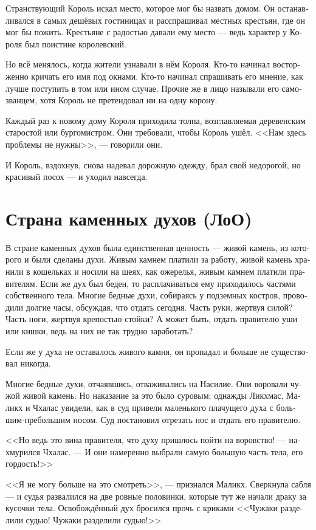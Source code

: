 \documentclass[a4paper,12pt,fleqn]{book}\usepackage{cooltooltips}\usepackage{polyglossia}\setdefaultlanguage[babelshorthands=true]{russian}\setotherlanguage{english}\defaultfontfeatures{Ligatures=TeX,Mapping=tex-text} \usepackage{xcolor}\definecolor{lightgray}{HTML}{bbbbbb}\color{lightgray}\newcommand{\ml}[3]{\textenglish{\textcolor{black}{#3}}}
\begin{document}
{Странствующий Король искал место, которое мог бы назвать домом.
Он останавливался в самых дешёвых гостиницах и расспрашивал местных крестьян, где он мог бы пожить.
Крестьяне с радостью давали ему место --- ведь характер у Короля был поистине королевский.

Но всё менялось, когда жители узнавали в нём Короля.
Кто-то начинал восторженно кричать его имя под окнами.
Кто-то начинал спрашивать его мнение, как лучше поступить в том или ином случае.
Прочие же в лицо называли его самозванцем, хотя Король не претендовал ни на одну корону.

Каждый раз к новому дому Короля приходила толпа, возглавляемая деревенским старостой или бургомистром.
Они требовали, чтобы Король ушёл.
<<Нам здесь проблемы не нужны>>, --- говорили они.

И Король, вздохнув, снова надевал дорожную одежду, брал свой недорогой, но красивый посох --- и уходил навсегда.

\section{Страна каменных духов (ЛоО)}

В стране каменных духов была единственная ценность --- живой камень, из которого и были сделаны духи.
Живым камнем платили за работу, живой камень хранили в кошельках и носили на шеях, как ожерелья, живым камнем платили правителям.
Если же дух был беден, то расплачиваться ему приходилось частями собственного тела.
Многие бедные духи, собираясь у подземных костров, проводили долгие часы, обсуждая, что отдать сегодня.
Часть руки, жертвуя силой?
Часть ноги, жертвуя крепостью стойки?
А может быть, отдать правителю уши или кишки, ведь на них не так трудно заработать?

Если же у духа не оставалось живого камня, он пропадал и больше не существовал никогда.

Многие бедные духи, отчаявшись, отваживались на Насилие.
Они воровали чужой живой камень.
Но наказание за это было суровым;
однажды Ликхмас, Маликх и Чхалас увидели, как в суд привели маленького плачущего духа с большим-пребольшим носом.
Суд постановил отрезать нос и отдать его правителю.

<<Но ведь это вина правителя, что духу пришлось пойти на воровство! --- нахмурился Чхалас.
--- И они намеренно выбрали самую большую часть тела, его гордость!>>

<<Я не могу больше на это смотреть>>, --- признался Маликх.
Сверкнула сабля --- и судья развалился на две ровные половинки, которые тут же начали драку за кусочки тела.
Освобождённый дух бросился прочь с криками <<Чужаки разделили судью! Чужаки разделили судью!>>

}
\end{document}
